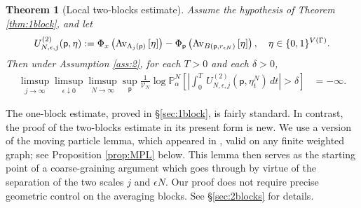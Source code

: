 \documentclass[11pt]{amsart}
\theoremstyle{plain}
\newtheorem{theorem}{Theorem}
\theoremstyle{definition}
\theoremstyle{remark}
\begin{document}
\begin{theorem}[Local two-blocks estimate]
\label{thm:2block}
Assume the hypothesis of Theorem \ref{thm:1block}, and let
\begin{align}
{U^{(2)}_{{{N}},{{\epsilon}},{{j}}}}({\mathsf{p}},\eta) := \Phi_x\left({{\rm Av}_{{\Lambda_j({\mathsf{p}})}}\left[{{\eta}}\right]}\right) -\Phi_{\mathsf{p}}\left({{\rm Av}_{{B({\mathsf{p}}, r_{\epsilon N})}}\left[{{\eta}}\right]}\right),\quad \eta\in \{0,1\}^{V(\Gamma)}.
\end{align}
Then under Assumption \ref{ass:2}, for each $T>0$ and each $\delta>0$,
\begin{align}
\label{2bp} \limsup_{j\to\infty} \limsup_{\epsilon\downarrow 0} \limsup_{N\to\infty} \sup_{\mathsf{p}} \frac{1}{\mathcal{V}_N} \log \mathbb{P}^N_\alpha \left[\left|\int_0^T \, {U^{(2)}_{{{N}},{{\epsilon}},{{j}}}}({\mathsf{p}},\eta^N_t) \,dt\right| >\delta \right] &=-\infty.
\end{align}
\end{theorem}

The one-block estimate, proved in \S\ref{sec:1block}, is fairly standard. In contrast, the proof of the two-blocks estimate in its present form is new. We use a version of the moving particle lemma, which appeared in \cite{ChenMPL}, valid on any finite weighted graph; see Proposition \ref{prop:MPL} below. This lemma then serves as the starting point of a coarse-graining argument which goes through by virtue of the separation of the two scales $j$ and $\epsilon N$. Our proof does not require precise geometric control on the averaging blocks. See \S\ref{sec:2blocks} for details.
\end{document}
